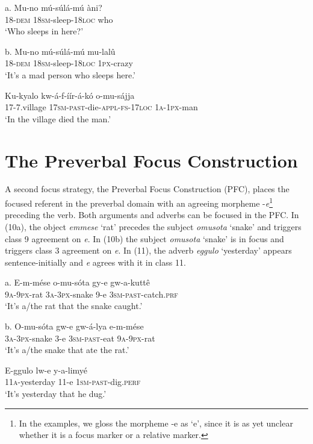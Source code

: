 \documentclass[output=paper]{langsci/langscibook}
\begin{document}
\ea
\gll a.  Mu-no    mú-súlá-mú    àni?\\
       18-\textsc{dem}  \textsc{18sm}{}-sleep-\textsc{18loc}  who\\
\glt   ‘Who sleeps in here?’
\z

\ea
\gll b.  Mu-no    mú-súlá-mú    mu-lalû\\
       18-\textsc{dem}  1\textsc{8sm}{}-sleep-\textsc{18loc}  \textsc{1px}{}-crazy\\
\glt   ‘It’s a mad person who sleeps here.’
\z

\ea
\gll Ku-kyalo  kw-á-f-íír-á-kó      o-mu-sájja\\
     17-7.village  \textsc{17sm}{}-\textsc{past}{}-die-\textsc{appl}{}-\textsc{fs}{}-\textsc{17loc}  \textsc{1a-1px}{}-man\\
\glt ‘In the village died the man.’
\z

\section{The Preverbal Focus Construction}
 

A second focus strategy, the Preverbal Focus Construction (PFC), places the focused referent in the preverbal domain with an agreeing morpheme -\textit{e}\footnote{ In the examples, we gloss the morpheme -e as ‘e’, since it is as yet unclear whether it is a focus marker or a relative marker.}{ }preceding the verb. Both arguments and adverbs can be focused in the PFC. In (10a), the object \textit{emmese} ‘rat’ precedes the subject \textit{omusota} ‘snake’ and triggers class 9 agreement on \textit{e}. In (10b) the subject \textit{omusota} ‘snake’ is in focus and triggers class 3 agreement on \textit{e}. In (11), the adverb \textit{eggulo} ‘yesterday’ appears sentence-initially and \textit{e }agrees with it in class 11.

\ea
\gll a.  E-m-mése  o-mu-sóta    gy-e  gw-a-kuttê{\textup{ }}\\
       \textsc{9a-9px}{}-rat  \textsc{3a}{}-\textsc{3px}{}-snake  9-e  \textsc{3sm}{}-\textsc{past}{}-catch.\textsc{prf}\\
\glt   ‘It’s a/the rat that the snake caught.’
\z

\ea
\gll b.  O-mu-sóta    gw-e  gw-á-lya    e-m-mése\\
       \textsc{3a-3px}{}-snake  3-e  \textsc{3sm-past}{}-eat  \textsc{9a-9px}{}-rat\\
\glt   ‘It’s a/the snake that ate the rat.’
\z

\ea
\gll E-ggulo    lw-e  y-a-limyé\\
     11\textsc{a}{}-yesterday  11-e  \textsc{1sm}{}-\textsc{past}{}-dig.\textsc{perf}\\
\glt ‘It’s yesterday that he dug.’
\z
\end{document}

